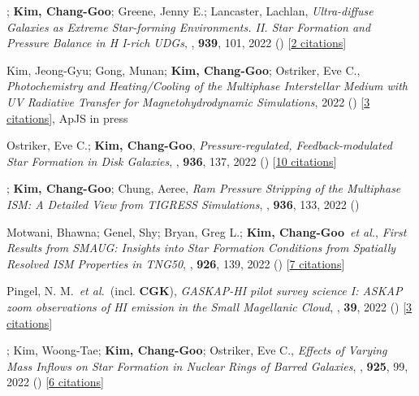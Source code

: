 \item[{43.}]; \textbf{Kim, Chang-Goo}; Greene, Jenny E.; Lancaster, Lachlan, \textit{Ultra-diffuse Galaxies as Extreme Star-forming Environments. II. Star Formation and Pressure Balance in H I-rich UDGs}, , \textbf{939}, 101, 2022 () [\href{http://adsabs.harvard.edu/abs/2022ApJ...939..101K}{2 citations}]

\item[{42.}]Kim, Jeong-Gyu; Gong, Munan; \textbf{Kim, Chang-Goo}; Ostriker, Eve C., \textit{Photochemistry and Heating/Cooling of the Multiphase Interstellar Medium with UV Radiative Transfer for Magnetohydrodynamic Simulations}, 2022 () [\href{http://adsabs.harvard.edu/abs/2022arXiv221008024K}{3 citations}], ApJS in press

\item[{41.}]Ostriker, Eve C.; \textbf{Kim, Chang-Goo}, \textit{Pressure-regulated, Feedback-modulated Star Formation in Disk Galaxies}, , \textbf{936}, 137, 2022 () [\href{http://adsabs.harvard.edu/abs/2022ApJ...936..137O}{10 citations}]

\item[{40.}]; \textbf{Kim, Chang-Goo}; Chung, Aeree, \textit{Ram Pressure Stripping of the Multiphase ISM: A Detailed View from TIGRESS Simulations}, , \textbf{936}, 133, 2022 ()

\item[{39.}]Motwani, Bhawna; Genel, Shy; Bryan, Greg L.; \textbf{Kim, Chang-Goo}~\textit{et al.}, \textit{First Results from SMAUG: Insights into Star Formation Conditions from Spatially Resolved ISM Properties in TNG50}, , \textbf{926}, 139, 2022 () [\href{http://adsabs.harvard.edu/abs/2022ApJ...926..139M}{7 citations}]

\item[{38.}]Pingel, N. M.~\textit{et al.}~(incl. \textbf{CGK}), \textit{GASKAP-HI pilot survey science I: ASKAP zoom observations of HI emission in the Small Magellanic Cloud}, , \textbf{39}, 2022 () [\href{http://adsabs.harvard.edu/abs/2022PASA...39....5P}{3 citations}]

\item[{37.}]; Kim, Woong-Tae; \textbf{Kim, Chang-Goo}; Ostriker, Eve C., \textit{Effects of Varying Mass Inflows on Star Formation in Nuclear Rings of Barred Galaxies}, , \textbf{925}, 99, 2022 () [\href{http://adsabs.harvard.edu/abs/2022ApJ...925...99M}{6 citations}]

